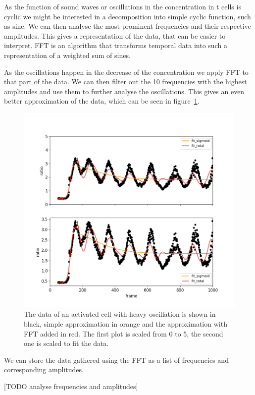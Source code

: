 As the function of sound waves or oscillations in the \Calcium concentration in t cells is cyclic we might be interested in a decomposition into simple cyclic function, such as sine. We can then analyse the most prominent frequencies and their respective amplitudes. This gives a representation of the data, that can be easier to interpret. FFT is an algorithm that transforms temporal data into such a representation of a weighted sum of sines.

As the oscillations happen in the decrease of the \Calcium concentration we apply FFT to that part of the data. We can then filter out the 10 frequencies with the highest amplitudes and use them to further analyse the oscillations. This gives an even better approximation of the data, which can be seen in figure~\ref{fig:particle_vis_fft_approx}.

\begin{figure}
	\centering
	\includegraphics[width=\textwidth]{fig/particle_vis_fft_approx_pos}
	
	\caption{The data of an activated cell with heavy oscillation is shown in black, simple approximation in orange and the approximation with FFT added in red. The first plot is scaled from 0 to 5, the second one is scaled to fit the data.}
	\label{fig:particle_vis_fft_approx}
\end{figure}

We can store the data gathered using the FFT as a list of frequencies and corresponding amplitudes.

[TODO analyse frequencies and amplitudes]


